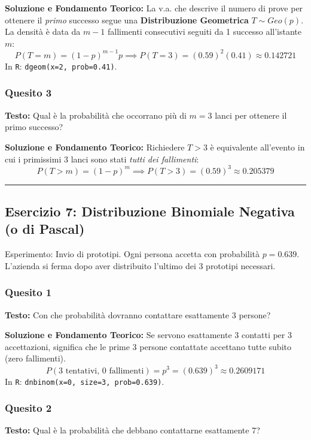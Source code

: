 \documentclass[12pt, a4paper]{article}
\begin{document}
\textbf{Soluzione e Fondamento Teorico:} 
La v.a. che descrive il numero di prove per ottenere il \textit{primo} successo segue una \textbf{Distribuzione Geometrica} $T \sim Geo(p)$.
La densità è data da $m-1$ fallimenti consecutivi seguiti da 1 successo all'istante $m$:
$$ P(T=m) = (1-p)^{m-1} p \implies P(T=3) = (0.59)^2 (0.41) \approx 0.142721 $$
In \texttt{R}: \texttt{dgeom(x=2, prob=0.41)}.

\subsubsection*{Quesito 3}
\textbf{Testo:} Qual è la probabilità che occorrano più di $m=3$ lanci per ottenere il primo successo?

\textbf{Soluzione e Fondamento Teorico:} 
Richiedere $T > 3$ è equivalente all'evento in cui i primissimi 3 lanci sono stati \textit{tutti dei fallimenti}:
$$ P(T > m) = (1-p)^m \implies P(T > 3) = (0.59)^3 \approx 0.205379 $$

\vspace{0.5cm}\hrule\vspace{0.5cm}

\subsection*{Esercizio 7: Distribuzione Binomiale Negativa (o di Pascal)}
Esperimento: Invio di prototipi. Ogni persona accetta con probabilità $p = 0.639$. L'azienda si ferma dopo aver distribuito l'ultimo dei 3 prototipi necessari.

\subsubsection*{Quesito 1}
\textbf{Testo:} Con che probabilità dovranno contattare esattamente 3 persone?

\textbf{Soluzione e Fondamento Teorico:} 
Se servono esattamente 3 contatti per 3 accettazioni, significa che le prime 3 persone contattate accettano tutte subito (zero fallimenti).
$$ P(\text{3 tentativi, 0 fallimenti}) = p^3 = (0.639)^3 \approx 0.2609171 $$
In \texttt{R}: \texttt{dnbinom(x=0, size=3, prob=0.639)}.

\subsubsection*{Quesito 2}
\textbf{Testo:} Qual è la probabilità che debbano contattarne esattamente 7?
\end{document}
